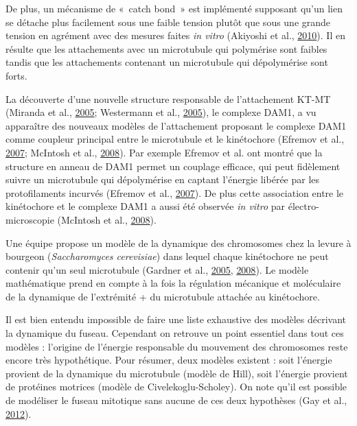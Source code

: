 \documentclass[12pt,a4paper,twoside,openright]{book}
\begin{document}
De plus, un mécanisme de «~catch bond~» est implémenté supposant qu'un
lien se détache plus facilement sous une faible tension plutôt que sous
une grande tension en agrément avec des mesures faites \emph{in vitro}
(Akiyoshi et al., \protect\hyperlink{ref-Akiyoshi2010}{2010}). Il en
résulte que les attachements avec un microtubule qui polymérise sont
faibles tandis que les attachements contenant un microtubule qui
dépolymérise sont forts.

La découverte d'une nouvelle structure responsable de l'attachement
KT-MT (Miranda et al., \protect\hyperlink{ref-Miranda2005}{2005};
Westermann et al., \protect\hyperlink{ref-Westermann2005}{2005}), le
complexe DAM1, a vu apparaître des nouveaux modèles de l'attachement
proposant le complexe DAM1 comme coupleur principal entre le microtubule
et le kinétochore (Efremov et al.,
\protect\hyperlink{ref-Efremov2007}{2007}; McIntosh et al.,
\protect\hyperlink{ref-McIntosh2008}{2008}). Par exemple Efremov et al.
ont montré que la structure en anneau de DAM1 permet un couplage
efficace, qui peut fidèlement suivre un microtubule qui dépolymérise en
captant l'énergie libérée par les protofilaments incurvés (Efremov et
al., \protect\hyperlink{ref-Efremov2007}{2007}). De plus cette
association entre le kinétochore et le complexe DAM1 a aussi été
observée \emph{in vitro} par électro-microscopie (McIntosh et al.,
\protect\hyperlink{ref-McIntosh2008}{2008}).

Une équipe propose un modèle de la dynamique des chromosomes chez la
levure à bourgeon (\emph{Saccharomyces cerevisiae}) dans lequel chaque
kinétochore ne peut contenir qu'un seul microtubule (Gardner et al.,
\protect\hyperlink{ref-Gardner2005}{2005},
\protect\hyperlink{ref-Gardner2008a}{2008}). Le modèle mathématique
prend en compte à la fois la régulation mécanique et moléculaire de la
dynamique de l'extrémité + du microtubule attachée au kinétochore.

Il est bien entendu impossible de faire une liste exhaustive des modèles
décrivant la dynamique du fuseau. Cependant on retrouve un point
essentiel dans tout ces modèles : l'origine de l'énergie responsable du
mouvement des chromosomes reste encore très hypothétique. Pour résumer,
deux modèles existent : soit l'énergie provient de la dynamique du
microtubule (modèle de Hill), soit l'énergie provient de protéines
motrices (modèle de Civelekoglu-Scholey). On note qu'il est possible de
modéliser le fuseau mitotique sans aucune de ces deux hypothèses (Gay et
al., \protect\hyperlink{ref-Gay2012a}{2012}).
\end{document}

